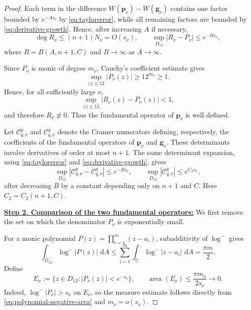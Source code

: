 \documentclass[12pt,letterpaper,reqno]{amsart}
\theoremstyle{definition}
\numberwithin{equation}{section}
\newcommand{\C}{\mathbb C}
\newcommand{\dA}{\,\mathrm dA}
\DeclareMathOperator{\meas}{area}
\newcommand{\gv}{\bm g}
\newcommand{\pv}{\bm p}
\begin{document}
\begin{proof}
Each term in the difference
\(W(\pv_\nu)-W(\gv_\nu)\) contains one factor bounded by
\(e^{-As_\nu}\) by \eqref{eq:taylorerror}, while all remaining factors
are bounded by \eqref{eq:derivative-growth}. Hence, after increasing
\(A\) if necessary,
\begin{equation}\label{eq:wronskiapprox}
 \deg R_\nu\leq (n+1)N_\nu=O(s_\nu),
 \qquad
 \sup_{D_{12}}|R_\nu-P_\nu|
 \leq e^{-Bs_\nu},
\end{equation}
where \(B=B(A,{n+1},C)\) and \(B\to\infty\) as \(A\to\infty\).

Since \(P_\nu\) is monic of degree \(m_\nu\), Cauchy's coefficient
estimate gives
\[
 \sup_{|z|\leq12}|P_\nu(z)|\geq12^{m_\nu}\geq1.
\]
Hence, for all sufficiently large \(\nu\),
\[
 \sup_{|z|\leq12}|R_\nu(z)-P_\nu(z)|<1,
\]
and therefore \(R_\nu\not\equiv0\). Thus the fundamental operator of
\(\pv_\nu\) is well defined.


Let \(\mathcal C_{q,\nu}^p\) and \(\mathcal C_{q,\nu}^g\) denote the
Cramer numerators defining, respectively, the coefficients of the
fundamental operators of \(\pv_\nu\) and \(\gv_\nu\). These
determinants involve derivatives of order at most \({n+1}\). The same
determinant expansion, using \eqref{eq:taylorerror} and
\eqref{eq:derivative-growth}, gives
\begin{equation}\label{eq:cramer-numerator-approx}
 \sup_{D_{12}}
 |\mathcal C_{q,\nu}^p-\mathcal C_{q,\nu}^g|
 \leq e^{-Bs_\nu},
 \qquad
 \sup_{D_{12}}|\mathcal C_{q,\nu}^g|
 \leq e^{C_2s_\nu},
\end{equation}
after decreasing \(B\) by a constant depending only on \({n+1}\) and
\(C\). Here \(C_2=C_2({n+1},C)\).


\medskip\noindent
\textbf{\underline{Step 2. Comparison of the two fundamental operators:}}
We first remove the set on which the denominator \(P_\nu\) is
exponentially small.

For a monic polynomial
\(P(z)=\prod_{i=1}^{m}(z-a_i)\), subadditivity of \(\log^-\) gives
\begin{equation}\label{eq:polynomial-negative-area}
 \int_{D_{12}}\log^-|P(z)|\,\dA
 \leq
 \sum_{i=1}^{m}
 \int_{\C}\log^-|z-a_i|\,\dA
 =
 \frac{\pi m}{2}.
\end{equation}
Define
\begin{equation}\label{eq:smallvalues}
 E_\nu
 :=
 \{z\in D_{12}:|P_\nu(z)|<e^{-s_\nu}\}.
 \qquad
 \meas(E_\nu)
 \leq
 \frac{\pi m_\nu}{2s_\nu}
 \longrightarrow0.
\end{equation}
Indeed, \(\log^-|P_\nu|>s_\nu\) on \(E_\nu\), so the measure estimate
follows directly from \eqref{eq:polynomial-negative-area} and
\(m_\nu=o(s_\nu)\).


\end{proof}
\end{document}
